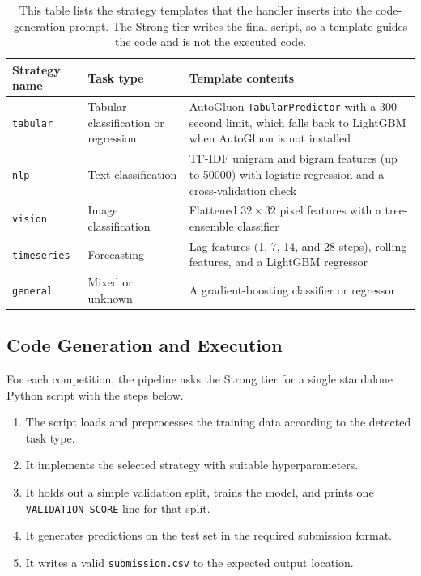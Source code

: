 \documentclass{article}
\begin{document}
\begin{table}[t]
\centering
\caption{This table lists the strategy templates that the handler inserts into the code-generation prompt. The Strong tier writes the final script, so a template guides the code and is not the executed code.}
\label{tab:strategies}
\begin{tabular}{@{}l>{\raggedright\arraybackslash}p{3.2cm}>{\raggedright\arraybackslash}p{7.0cm}@{}}
\toprule
\textbf{Strategy name} & \textbf{Task type} & \textbf{Template contents} \\
\midrule
\texttt{tabular}    & Tabular classification or regression & AutoGluon \texttt{TabularPredictor} with a 300-second limit, which falls back to LightGBM when AutoGluon is not installed \\
\texttt{nlp}        & Text classification & TF-IDF unigram and bigram features (up to \num{50000}) with logistic regression and a cross-validation check \\
\texttt{vision}     & Image classification & Flattened $32 \times 32$ pixel features with a tree-ensemble classifier \\
\texttt{timeseries} & Forecasting & Lag features (1, 7, 14, and 28 steps), rolling features, and a LightGBM regressor \\
\texttt{general}    & Mixed or unknown & A gradient-boosting classifier or regressor \\
\bottomrule
\end{tabular}
\end{table}

\subsection{Code Generation and Execution}

For each competition, the pipeline asks the Strong tier for a single standalone Python script with the steps below.
\begin{enumerate}[leftmargin=*,nosep]
  \item The script loads and preprocesses the training data according to the detected task type.
  \item It implements the selected strategy with suitable hyperparameters.
  \item It holds out a simple validation split, trains the model, and prints one \texttt{VALIDATION\_SCORE} line for that split.
  \item It generates predictions on the test set in the required submission format.
  \item It writes a valid \texttt{submission.csv} to the expected output location.
\end{enumerate}
\end{document}

